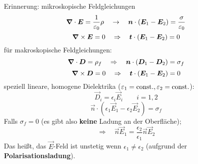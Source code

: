 \begin{center}
\end{center}
Erinnerung: mikroskopische Feldgleichungen
\begin{equation*}
\bm{\nabla} \cdot \bm{E} = \frac{1}{\varepsilon_0} \rho \quad \rightarrow \quad \bm{n} \cdot (\bm{E}_1 - \bm{E}_2) = \frac{\sigma}{\varepsilon_0}
\end{equation*}
\begin{equation*}
\bm{\nabla} \times \bm{E} = 0 \quad \Rightarrow \quad \bm{t} \cdot (\bm{E}_1 - \bm{E}_2) = 0
\end{equation*}
für makroskopische Feldgleichungen:
\begin{equation*}
\bm{\nabla} \cdot \bm{D} = \rho_f \quad \Rightarrow \quad \bm{n} \cdot (\bm{D}_1 - \bm{D}_2) = \sigma_f
\end{equation*}
\begin{equation*}
\bm{\nabla} \times \bm{D} = 0 \quad \Rightarrow \quad \bm{t} \cdot (\bm{E}_1 - \bm{E}_2) = 0
\end{equation*}
speziell lineare, homogene Dielektrika ($ \varepsilon_1 = \textrm{const.}, \varepsilon_2 = \textrm{const.} $):
\begin{equation*}
\vec{D}_i = \epsilon_i \vec{E}_i \qquad i = 1,2
\end{equation*}
\begin{equation*}
\vec{n} \cdot (\epsilon_1 \vec{E}_1 - \epsilon_2 \vec{E}_2) = \sigma_f
\end{equation*}
Falls $ \sigma_f = 0 $ (es gibt also \textbf{keine} Ladung an der Oberfläche);
\begin{equation*}
\Rightarrow \quad \vec{n} \vec{E}_1 = \frac{\epsilon_2}{\epsilon_1} \vec{n} \vec{E}_2
\end{equation*}
Das heißt, das $ \vec{E} $-Feld ist unstetig wenn $ \epsilon_1 \neq \epsilon_2 $ (aufgrund der \textbf{Polarisationsladung}).

